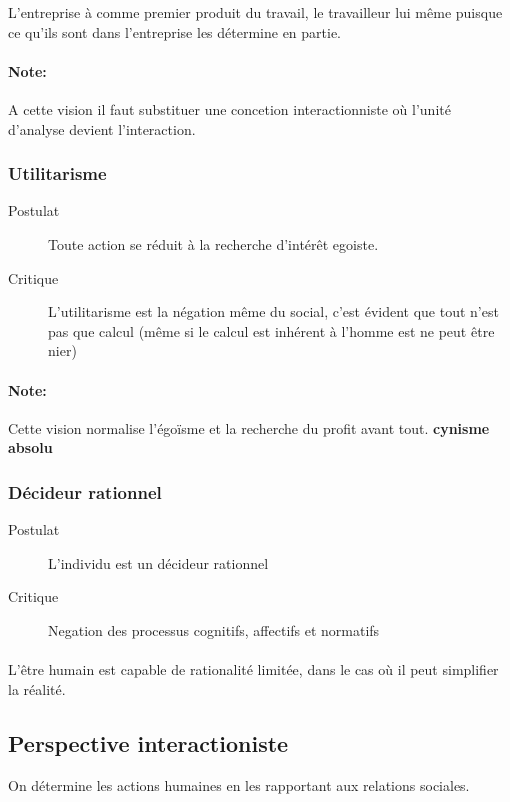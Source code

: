 \documentclass[11pt]{article} %
\begin{document}
L'entreprise à comme premier produit du travail, le travailleur lui même
puisque ce qu'ils sont dans l'entreprise les détermine en partie.

\paragraph{Note:} A cette vision il faut substituer une concetion
interactionniste où l'unité d'analyse devient l'interaction.

\subsubsection{Utilitarisme}

\begin{description}
    \item[Postulat] Toute action se réduit à la recherche d'intérêt egoiste.
    \item[Critique] L'utilitarisme est la négation même du social, c'est
        évident que tout n'est pas que calcul (même si le calcul est
        inhérent à l'homme est ne peut être nier)
\end{description}

\paragraph{Note: } Cette vision normalise l'égoïsme et la recherche du
profit avant tout. \textbf{cynisme absolu}

\subsubsection{Décideur rationnel}

\begin{description}
    \item[Postulat] L'individu est un décideur rationnel
    \item[Critique] Negation des processus cognitifs, affectifs et normatifs
\end{description}

\paragraph{} L'être humain est capable de rationalité limitée, dans le
cas où il peut simplifier la réalité.

\subsection{Perspective interactioniste}
On détermine les actions humaines en les rapportant aux relations
sociales. 
\end{document}
